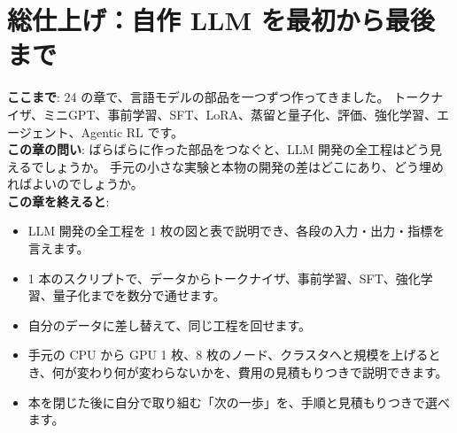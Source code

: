 \chapter{総仕上げ：自作 LLM を最初から最後まで}\label{ch:capstone}

\begin{chapterlead}
\textbf{ここまで}: 24 の章で、言語モデルの部品を一つずつ作ってきました。
トークナイザ、ミニGPT、事前学習、SFT、LoRA、蒸留と量子化、評価、強化学習、エージェント、Agentic RL です。\\
\textbf{この章の問い}: ばらばらに作った部品をつなぐと、LLM 開発の全工程はどう見えるでしょうか。
手元の小さな実験と本物の開発の差はどこにあり、どう埋めればよいのでしょうか。\\[1mm]
\textbf{この章を終えると}:
\begin{itemize}
\item LLM 開発の全工程を 1 枚の図と表で説明でき、各段の入力・出力・指標を言えます。
\item 1 本のスクリプトで、データからトークナイザ、事前学習、SFT、強化学習、量子化までを数分で通せます。
\item 自分のデータに差し替えて、同じ工程を回せます。
\item 手元の CPU から GPU 1 枚、8 枚のノード、クラスタへと規模を上げるとき、何が変わり何が変わらないかを、費用の見積もりつきで説明できます。
\item 本を閉じた後に自分で取り組む「次の一歩」を、手順と見積もりつきで選べます。
\end{itemize}
\end{chapterlead}

